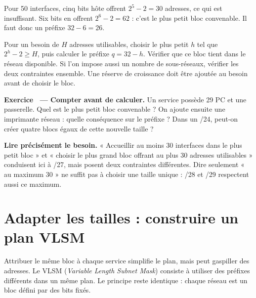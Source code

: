 \documentclass[11pt,a4paper]{article}
\newif\ifcorrige
\newcounter{exo}
\newcommand{\exo}[2]{%
  \Needspace{6cm}\stepcounter{exo}\begin{quest}\textbf{Exercice \theexo\ — #1.} #2\end{quest}}
\newcommand{\zone}[2]{%
  \ifcorrige
    \begin{tcolorbox}[colback=corrbg,colframe=corr,boxrule=0.6pt,arc=1pt,left=5pt,right=5pt,
      fontupper=\small\color{corr}]#2\end{tcolorbox}%
  \else
    \begin{tcolorbox}[colback=white,colframe=black!45,boxrule=0.5pt,arc=1pt,height=#1]\end{tcolorbox}%
  \fi}
\begin{document}
Pour 50 interfaces, cinq bits hôte offrent $2^5-2=30$ adresses, ce qui est insuffisant.
Six bits en offrent $2^6-2=62$ : c'est le plus petit bloc convenable.
Il faut donc un préfixe $32-6=26$.

\begin{methode}
Pour un besoin de $H$ adresses utilisables, choisir le plus petit $h$ tel que $2^h-2\geq H$,
puis calculer le préfixe $q=32-h$. Vérifier que ce bloc tient dans le réseau disponible.
Si l'on impose aussi un nombre de sous-réseaux, vérifier les deux contraintes ensemble.
Une réserve de croissance doit être ajoutée au besoin avant de choisir le bloc.
\end{methode}

\exo{Compter avant de calculer}{Un service possède 29 PC et une passerelle. Quel est le plus petit bloc
convenable ? On ajoute ensuite une imprimante réseau : quelle conséquence sur le préfixe ?
Dans un /24, peut-on créer quatre blocs égaux de cette nouvelle taille ?}
\zone{2.4cm}{29 PC + 1 passerelle = 30 interfaces : /27 suffit.
Avec l'imprimante, il faut 31 adresses : /26 est nécessaire et offre 62 adresses utilisables.
Un /24 contient quatre /26 : les deux contraintes sont satisfaites.}

\begin{piege}
\textbf{Lire précisément le besoin.} « Accueillir au moins 30 interfaces dans le plus petit bloc »
et « choisir le plus grand bloc offrant au plus 30 adresses utilisables » conduisent ici à /27,
mais posent deux contraintes différentes. Dire seulement « au maximum 30 » ne suffit pas à choisir
une taille unique : /28 et /29 respectent aussi ce maximum.
\end{piege}

\Needspace{11cm}
\section{Adapter les tailles : construire un plan VLSM}
Attribuer le même bloc à chaque service simplifie le plan, mais peut gaspiller des adresses.
Le VLSM (\emph{Variable Length Subnet Mask}) consiste à utiliser des préfixes différents dans
un même plan. Le principe reste identique : chaque réseau est un bloc défini par des bits fixés.
\end{document}
